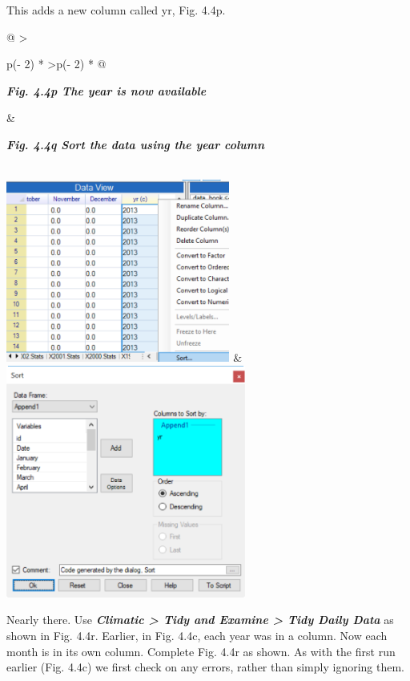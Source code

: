 \documentclass[
  letterpaper,
  DIV=11,
  numbers=noendperiod]{scrreprt}
\begin{document}
This adds a new column called yr, Fig. 4.4p.

\begin{longtable}[]{@{}
  >{\raggedright\arraybackslash}p{(\columnwidth - 2\tabcolsep) * }
  >{\raggedleft\arraybackslash}p{(\columnwidth - 2\tabcolsep) * }@{}}
\toprule\noalign{}
\begin{minipage}[b]{\linewidth}\raggedright
\textbf{\emph{Fig. 4.4p The year is now available}}
\end{minipage} & \begin{minipage}[b]{\linewidth}\raggedleft
\textbf{\emph{Fig. 4.4q Sort the data using the year column}}
\end{minipage} \\
\midrule\noalign{}
\endhead
\bottomrule\noalign{}
\endlastfoot
\includegraphics[width=2.90099in,height=2.36191in]{figures/Fig4.4p.png}
&
\includegraphics[width=3.0999in,height=3.01361in]{figures/Fig4.4q.png} \\
\end{longtable}

Nearly there. Use \textbf{\emph{Climatic \textgreater{} Tidy and Examine
\textgreater{} Tidy Daily Data}} as shown in Fig. 4.4r. Earlier, in Fig.
4.4c, each year was in a column. Now each month is in its own column.
Complete Fig. 4.4r as shown. As with the first run earlier (Fig. 4.4c)
we first check on any errors, rather than simply ignoring them.
\end{document}
